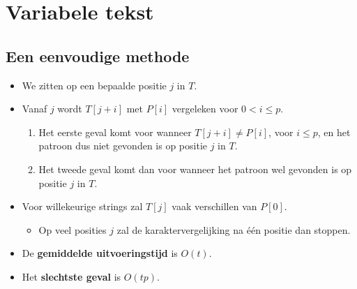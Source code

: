 \section{Variabele tekst}

\subsection{Een eenvoudige methode}
\begin{itemize}
    \item We zitten op een bepaalde positie $j$ in $T$.
    \item Vanaf $j$ wordt $T[j + i]$ met $P[i]$ vergeleken voor $0 < i \leq p$.
    \begin{enumerate}
        \item Het eerste geval komt voor wanneer $T[j + i] \neq P[i]$, voor $i \leq p$, en het patroon dus niet gevonden is op positie $j$ in $T$.
        \item Het tweede geval komt dan voor wanneer het patroon wel gevonden is op positie $j$ in $T$.
    \end{enumerate}
    \item Voor willekeurige strings zal $T[j]$ vaak verschillen van $P[0]$.
    \begin{itemize}
        \item Op veel posities $j$ zal de karaktervergelijking na één positie dan stoppen.
    \end{itemize}
    \item De \textbf{gemiddelde uitvoeringstijd} is $O(t)$.
    \item Het \textbf{slechtste geval} is $O(tp)$.
\end{itemize}

